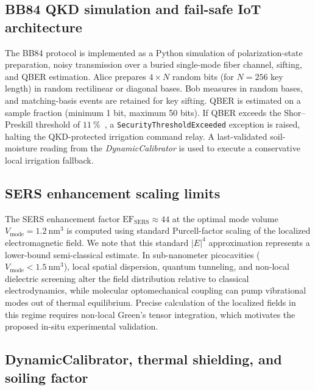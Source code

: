 \documentclass[onecolumn,a4paper,12pt]{article}
\begin{document}
\subsection*{BB84 QKD simulation and fail-safe IoT architecture}

The BB84 protocol is implemented as a Python simulation of polarization-state preparation, noisy transmission over a buried single-mode fiber channel, sifting, and QBER estimation.
Alice prepares $4 \times N$ random bits (for $N = 256$ key length) in random rectilinear or diagonal bases.
Bob measures in random bases, and matching-basis events are retained for key sifting.
QBER is estimated on a sample fraction (minimum 1 bit, maximum 50 bits).
If QBER exceeds the Shor--Preskill threshold of $\qty{11}{\percent}$~\cite{Shor2000}, a \texttt{SecurityThresholdExceeded} exception is raised, halting the QKD-protected irrigation command relay.
A last-validated soil-moisture reading from the \textit{DynamicCalibrator} is used to execute a conservative local irrigation fallback.

\subsection*{SERS enhancement scaling limits}

The SERS enhancement factor $\mathrm{EF}_{\mathrm{SERS}} \approx 44$ at the optimal mode volume $V_{\mathrm{mode}} = \qty{1.2}{\nm\cubed}$ is computed using standard Purcell-factor scaling of the localized electromagnetic field. We note that this standard $|E|^4$ approximation represents a lower-bound semi-classical estimate. In sub-nanometer picocavities ($V_{\mathrm{mode}} < \qty{1.5}{\nm\cubed}$), local spatial dispersion, quantum tunneling, and non-local dielectric screening alter the field distribution relative to classical electrodynamics, while molecular optomechanical coupling can pump vibrational modes out of thermal equilibrium. Precise calculation of the localized fields in this regime requires non-local Green's tensor integration, which motivates the proposed in-situ experimental validation.

\subsection*{DynamicCalibrator, thermal shielding, and soiling factor}
\end{document}
